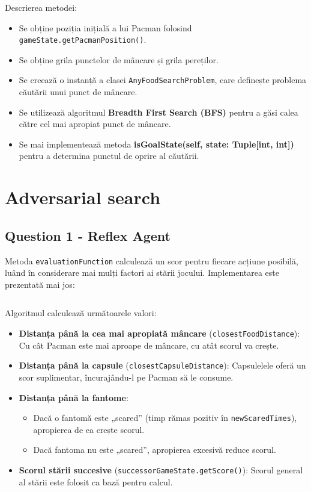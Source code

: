 \par Descrierea metodei:
\begin{itemize}
	\item Se obține poziția inițială a lui Pacman folosind \texttt{gameState.getPacmanPosition()}.
	\item Se obține grila punctelor de mâncare și grila pereților.
	\item Se creează o instanță a clasei \texttt{AnyFoodSearchProblem}, care definește problema căutării unui punct de mâncare.
	\item Se utilizează algoritmul \textbf{Breadth First Search (BFS)} pentru a găsi calea către cel mai apropiat punct de mâncare.
	\item Se mai implementează metoda \textbf{isGoalState(self, state: Tuple[int, int])} pentru a determina punctul de oprire al căutării.
\end{itemize}

\section{Adversarial search}
\subsection{Question 1 - Reflex Agent}
\par Metoda \texttt{evaluationFunction} calculează un scor pentru fiecare acțiune posibilă, luând în considerare mai mulți factori ai stării jocului. Implementarea este prezentată mai jos:
\inputminted[linenos]{python}{code/reflex_agent.py}

\par Algoritmul calculează următoarele valori:
\begin{itemize}
	\item \textbf{Distanța până la cea mai apropiată mâncare} (\texttt{closestFoodDistance}): Cu cât Pacman este mai aproape de mâncare, cu atât scorul va crește.
	\item \textbf{Distanța până la capsule} (\texttt{closestCapsuleDistance}): Capsulelele oferă un scor suplimentar, încurajându-l pe Pacman să le consume.
	\item \textbf{Distanța până la fantome}: 
	\begin{itemize}
		\item Dacă o fantomă este „scared” (timp rămas pozitiv în \texttt{newScaredTimes}), apropierea de ea crește scorul.
		\item Dacă fantoma nu este „scared”, apropierea excesivă reduce scorul.
	\end{itemize}
	\item \textbf{Scorul stării succesive} (\texttt{successorGameState.getScore()}): Scorul general al stării este folosit ca bază pentru calcul.
\end{itemize}

